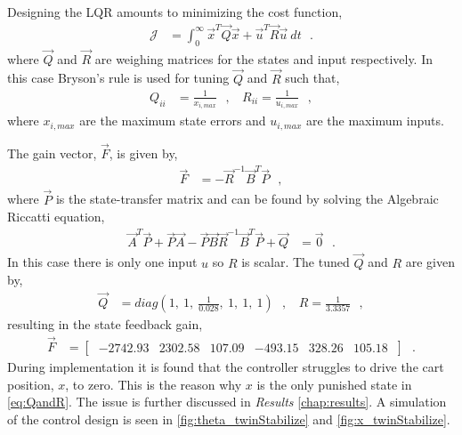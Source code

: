 Designing the LQR amounts to minimizing the cost function,
\begin{align}
\mathcal{J} &= \int_{0}^{\infty} \vec{x}^T \vec{Q} \vec{x} + \vec{u}^T \vec{R} \vec{u} \ dt \ \ \ .
\label{eq:costFunctionLQR}
\end{align}
where $\vec{Q}$ and $\vec{R}$ are weighing matrices for the states and input respectively. In this case Bryson's rule is used for tuning $\vec{Q}$ and $\vec{R}$ such that,
\begin{align}
  Q_{ii} &= \frac{1}{x_{i,max} }  \ \ \ , \ \ \ \ R_{ii} = \frac{1}{u_{i,max} } \ \ \ ,
\end{align}
where $x_{i,max}$ are the maximum state errors and $u_{i,max}$ are the maximum inputs.

The gain vector, $\vec{F}$, is given by,
\begin{align} 
\vec{F} &= -\vec{R}^{-1}\vec{B}^T\vec{P} \ \ \ ,
\label{eq:gainAndStateTransferMatrix}
\end{align}
where $\vec{P}$ is the state-transfer matrix and can be found by solving the Algebraic Riccatti equation,
\begin{align} 
\vec{A}^T\vec{P}+\vec{P}\vec{A}-\vec{P}\vec{B}\vec{R}^{-1}\vec{B}^T\vec{P}+\vec{Q} &= \vec{0} \ \ \ .
\label{eq:algebraicRiccattiEquation}
\end{align}
%
%
%
In this case there is only one input $u$ so $R$ is scalar. The tuned $\vec{Q}$ and $R$ are given by,
\begin{align}
  \vec{Q} &= diag( 1,\ 1,\ \tfrac{1}{ 0.028 },\ 1,\ 1,\ 1 )  \ \ \ , \ \ \ \
  R        = \frac{1}{ 3.3357 } \ \ \ , \label{eq:QandR}
\end{align}
%
resulting in the state feedback gain,
%
\begin{align}
\vec{F} &= [\ 
             \begin{matrix}
               -2742.93 & 2302.58 & 107.09 & -493.15 & 328.26 & 105.18
             \end{matrix}
         \ ] \ \ \ .
\end{align}
%
During implementation it is found that the controller struggles to drive the cart position, $x$, to zero. This is the reason why $x$ is the only punished state in \autoref{eq:QandR}. The issue is further discussed in \textit{Results} \autoref{chap:results}. A simulation of the control design is seen in \autoref{fig:theta_twinStabilize} and \ref{fig:x_twinStabilize}.
